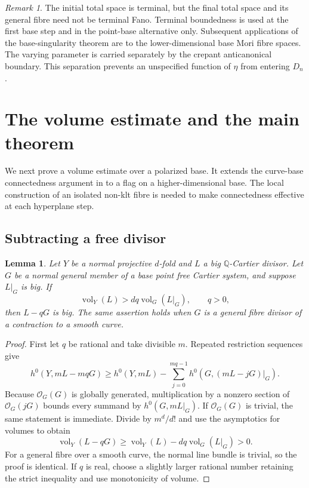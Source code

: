 \documentclass[11pt,reqno]{amsart}
\numberwithin{equation}{section}
\newtheorem{lemma}[theorem]{Lemma}
\theoremstyle{definition}
\theoremstyle{remark}
\newtheorem{remark}[theorem]{Remark}
\newcommand{\Q}{\mathbb Q}
\newcommand{\OO}{\mathcal O}
\newcommand{\vol}{\operatorname{vol}}
\begin{document}
\begin{remark}\label{rem:fixed}
The initial total space is terminal, but the final total space and its general fibre need not be terminal Fano. Terminal boundedness is used at the first base step and in the point-base alternative only. Subsequent applications of the base-singularity theorem are to the lower-dimensional base Mori fibre spaces. The varying parameter is carried separately by the crepant anticanonical boundary. This separation prevents an unspecified function of $\eta$ from entering $D_n$.
\end{remark}

\section{The volume estimate and the main theorem}\label{sec:volume}

We next prove a volume estimate over a polarized base. It extends the curve-base connectedness argument in \cite[Theorem~6.1]{Jiang21} to a flag on a higher-dimensional base. The local construction of an isolated non-klt fibre is needed to make connectedness effective at each hyperplane step.

\subsection{Subtracting a free divisor}
\begin{lemma}\label{lem:sections}
Let $Y$ be a normal projective $d$-fold and $L$ a big $\Q$-Cartier divisor. Let $G$ be a normal general member of a base point free Cartier system, and suppose $L|_G$ is big. If
\[
 \vol_Y(L)>dq\vol_G(L|_G),\qquad q>0,
\]
then $L-qG$ is big. The same assertion holds when $G$ is a general fibre divisor of a contraction to a smooth curve.
\end{lemma}
\begin{proof}
First let $q$ be rational and take divisible $m$. Repeated restriction sequences give
\[
 h^0(Y,mL-mqG)\ge h^0(Y,mL)
 -\sum_{j=0}^{mq-1}h^0(G,(mL-jG)|_G).
\]
Because $\OO_G(G)$ is globally generated, multiplication by a nonzero section of $\OO_G(jG)$ bounds every summand by $h^0(G,mL|_G)$. If $\OO_G(G)$ is trivial, the same statement is immediate. Divide by $m^d/d!$ and use the asymptotics for volumes to obtain
\begin{equation}\label{eq:subtract}
 \vol_Y(L-qG)\ge\vol_Y(L)-dq\vol_G(L|_G)>0.
\end{equation}
For a general fibre over a smooth curve, the normal line bundle is trivial, so the proof is identical. If $q$ is real, choose a slightly larger rational number retaining the strict inequality and use monotonicity of volume.
\end{proof}
\end{document}
